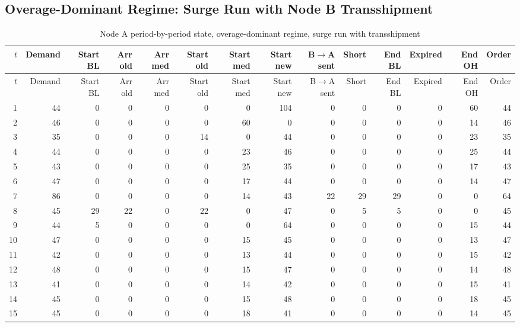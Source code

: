 \documentclass[11pt]{article}
\begin{document}
\begin{landscape}
\subsection{Overage-Dominant Regime: Surge Run with Node B Transshipment}

\begin{longtable}{rrrrrrrrrrrrrr}
\caption{Node A period-by-period state, overage-dominant regime, surge run with transshipment}\label{tab:appendix-overage-a}\\
\toprule
$t$ & Demand & Start BL & Arr old & Arr med & Start old & Start med & Start new & B$\rightarrow$A sent & Short & End BL & Expired & End OH & Order \\
\midrule
\endfirsthead
\toprule
$t$ & Demand & Start BL & Arr old & Arr med & Start old & Start med & Start new & B$\rightarrow$A sent & Short & End BL & Expired & End OH & Order \\
\midrule
\endhead
1 & 44 & 0 & 0 & 0 & 0 & 0 & 104 & 0 & 0 & 0 & 0 & 60 & 44 \\
2 & 46 & 0 & 0 & 0 & 0 & 60 & 0 & 0 & 0 & 0 & 0 & 14 & 46 \\
3 & 35 & 0 & 0 & 0 & 14 & 0 & 44 & 0 & 0 & 0 & 0 & 23 & 35 \\
4 & 44 & 0 & 0 & 0 & 0 & 23 & 46 & 0 & 0 & 0 & 0 & 25 & 44 \\
5 & 43 & 0 & 0 & 0 & 0 & 25 & 35 & 0 & 0 & 0 & 0 & 17 & 43 \\
6 & 47 & 0 & 0 & 0 & 0 & 17 & 44 & 0 & 0 & 0 & 0 & 14 & 47 \\
7 & 86 & 0 & 0 & 0 & 0 & 14 & 43 & 22 & 29 & 29 & 0 & 0 & 64 \\
8 & 45 & 29 & 22 & 0 & 22 & 0 & 47 & 0 & 5 & 5 & 0 & 0 & 45 \\
9 & 44 & 5 & 0 & 0 & 0 & 0 & 64 & 0 & 0 & 0 & 0 & 15 & 44 \\
10 & 47 & 0 & 0 & 0 & 0 & 15 & 45 & 0 & 0 & 0 & 0 & 13 & 47 \\
11 & 42 & 0 & 0 & 0 & 0 & 13 & 44 & 0 & 0 & 0 & 0 & 15 & 42 \\
12 & 48 & 0 & 0 & 0 & 0 & 15 & 47 & 0 & 0 & 0 & 0 & 14 & 48 \\
13 & 41 & 0 & 0 & 0 & 0 & 14 & 42 & 0 & 0 & 0 & 0 & 15 & 41 \\
14 & 45 & 0 & 0 & 0 & 0 & 15 & 48 & 0 & 0 & 0 & 0 & 18 & 45 \\
15 & 45 & 0 & 0 & 0 & 0 & 18 & 41 & 0 & 0 & 0 & 0 & 14 & 45 \\
\bottomrule
\end{longtable}


\end{landscape}
\end{document}
